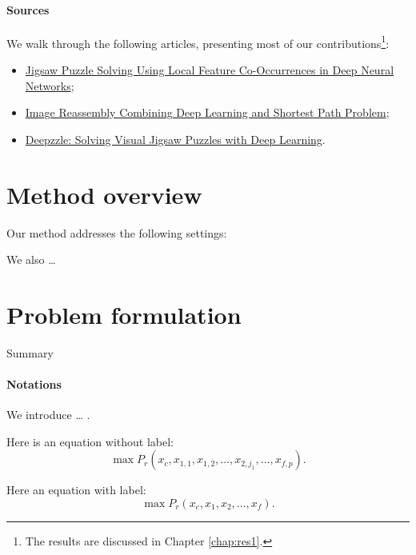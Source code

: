\blindtext

\paragraph{Sources}We walk through the following articles, presenting most of our contributions\footnote{The results are discussed in Chapter \ref{chap:res1}.}:
\begin{itemize}
    \item \href{https://hal.archives-ouvertes.fr/hal-01820489v2}{\publititle Jigsaw Puzzle Solving Using Local Feature Co-Occurrences in Deep Neural Networks};
    \item \href{https://hal.archives-ouvertes.fr/hal-01869765v2}{\publititle Image Reassembly Combining Deep Learning and Shortest Path Problem};
    \item \href{https://hal.archives-ouvertes.fr/hal-02494602v1}{\publititle Deepzzle: Solving Visual Jigsaw Puzzles with Deep Learning}.
\end{itemize}



\section{Method overview}
\label{sec:mth1:ovw}

\blindtext

Our method addresses the following settings:
\blinditemize

We also …


\section{Problem formulation}
\label{sec:mth1:formul}

Summary \blindtext

\paragraph{Notations} We introduce … .

\newthought{} Here is an equation without label:
\begin{equation*}
    \max P_r(x_c, x_{1,1}, x_{1,2}, \ldots, x_{2,j_1}, \ldots, x_{f,p}).
\end{equation*}

Here an equation with label:
\begin{equation}
    \label{eq:mth1:01}
    \max P_r(x_c, x_1, x_2, \ldots, x_f).
\end{equation}

